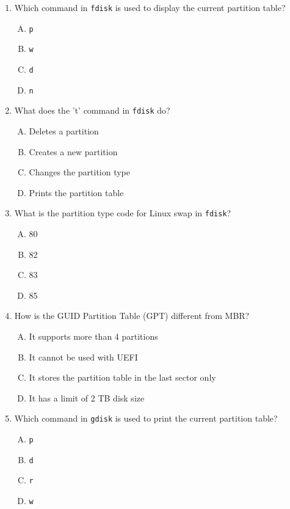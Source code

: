 \documentclass[a4paper]{report}
\begin{document}
\begin{enumerate}[1.]
    \item Which command in \texttt{fdisk} is used to display the current partition table?  
    \begin{enumerate}[A)]
        \item \texttt{p}  
        \item \texttt{w}  
        \item \texttt{d}  
        \item \texttt{n}  
    \end{enumerate}

    \item What does the 't' command in \texttt{fdisk} do?  
    \begin{enumerate}[A)]
        \item Deletes a partition  
        \item Creates a new partition  
        \item Changes the partition type  
        \item Prints the partition table  
    \end{enumerate}

    \item What is the partition type code for Linux swap in \texttt{fdisk}?  
    \begin{enumerate}[A)]
        \item 80  
        \item 82  
        \item 83  
        \item 85  
    \end{enumerate}

    \item How is the GUID Partition Table (GPT) different from MBR?  
    \begin{enumerate}[A)]
        \item It supports more than 4 partitions  
        \item It cannot be used with UEFI  
        \item It stores the partition table in the last sector only  
        \item It has a limit of 2 TB disk size  
    \end{enumerate}

    \item Which command in \texttt{gdisk} is used to print the current partition table?  
    \begin{enumerate}[A)]
        \item \texttt{p}  
        \item \texttt{d}  
        \item \texttt{r}  
        \item \texttt{w}  
    \end{enumerate}


\end{enumerate}
\end{document}
